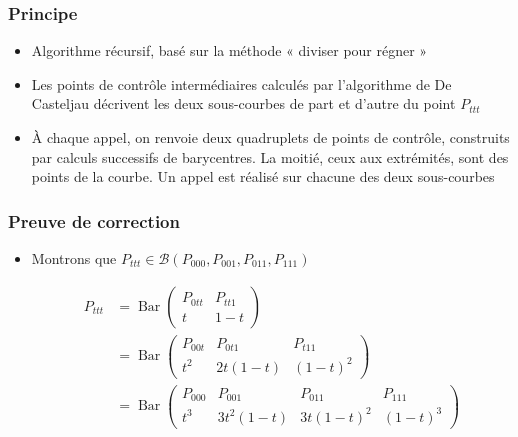 \documentclass[french]{beamer}
\DeclareMathOperator{\bary}{Bar}
\begin{document}
\begin{frame}
  \frametitle{Principe}

  \begin{itemize}

  \item
    Algorithme récursif, basé sur la méthode « diviser pour régner »

  \item
    Les points de contrôle intermédiaires calculés par l'algorithme de De Casteljau décrivent les deux sous-courbes de part et d'autre du point $P_{ttt}$

    \item
      À chaque appel, on renvoie deux quadruplets de points de contrôle, construits par calculs successifs de barycentres. La moitié, ceux aux extrémités, sont des points de la courbe. Un appel est réalisé sur chacune des deux sous-courbes

  \end{itemize}
  
\end{frame}

\begin{frame}
  \frametitle{Preuve de correction}

  {\small
    \begin{itemize}
      
    \item
      Montrons que $P_{ttt} \in \mathcal{B}(P_{000},P_{001},P_{011},P_{111})$
      
      \begin{align*}
        P_{ttt}
        & = \bary \begin{pmatrix} P_{0tt} & P_{tt1} \\ t & 1-t\end{pmatrix} \\
          & = \bary \begin{pmatrix} P_{00t} & P_{0t1} & P_{t11} \\ t^2 & 2t(1-t) & (1-t)^2\end{pmatrix} \\
            & = \bary \begin{pmatrix} P_{000} & P_{001} & P_{011} & P_{111} \\ t^3 & 3t^2(1-t) & 3t(1-t)^2 & (1-t)^3\end{pmatrix}
      \end{align*}
      
    \end{itemize}
  }
  
\end{frame}
\end{document}
